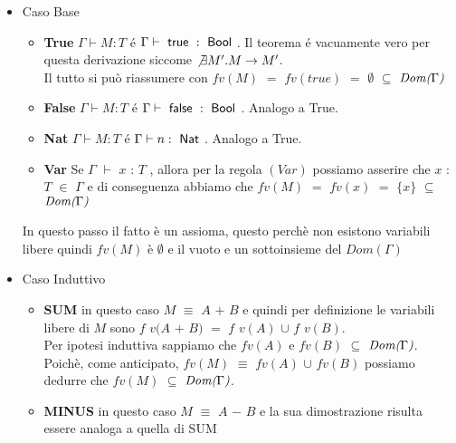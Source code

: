 \begin{itemize}


\item Caso Base 
		\begin{itemize}[label=$\star$]

		\item \textbf{True}  $\Gamma \vdash{} M : T$ \'e $\Gamma \vdash{} \true{} : \Bool$.
  		Il teorema \'e vacuamente vero per questa derivazione siccome $\not \exists{M'}. M \to{} M'$.\\
  		Il tutto si pu\`o riassumere con $fv(M)$ $=$ $fv(true)$ $=$ $\emptyset$ $\subseteq$ $\emph{Dom(}\Gamma\emph{)}$

  
 		\item \textbf{False} $\Gamma \vdash{} M : T$ \'e $\Gamma \vdash{} \false{} : \Bool$. Analogo a True.

		\item \textbf{Nat} $\Gamma \vdash{} M : T$ \'e $\Gamma \vdash{} n : \Nat$. Analogo a True.

		\item \textbf{Var}  Se $\Gamma$ $\vdash$ $x$ : $T$ , allora per la regola $(Var)$ possiamo asserire che $x$ : $T$ $\in$ $\Gamma$ e di conseguenza abbiamo che  $fv(M)$ $=$ $fv(x)$ $=$ $\{x\}$ $\subseteq$ $\emph{Dom(}\Gamma\emph{)}$

  
		\end{itemize}
		In questo passo il fatto \`e un assioma, questo perch\`e non esistono variabili libere quindi $fv(M)$ \`e $\emptyset$ e il vuoto e un sottoinsieme del $Dom(\Gamma)$

\item Caso Induttivo
		
		\begin{itemize}[label=$\star$]

		\item \textbf{SUM}  in questo caso $M$ $\equiv$ $A$ $+$ $B$ e quindi per definizione le variabili libere di $M$ sono $f$ $v(A$ $+$ $B)$ $=$ $f$ $v(A)$ $\cup$ $f$ $v(B)$.\\ Per ipotesi induttiva sappiamo che $fv(A)$ e $fv(B)$ $\subseteq$ $\emph{Dom(}\Gamma\emph{)}$.\\Poich\`e, come anticipato, $fv(M)$ $\equiv$ $fv(A)$ $\cup$ $fv(B)$ possiamo dedurre che $fv(M)$ $\subseteq$ $\emph{Dom(}\Gamma\emph{)}$.
  		
  
 		\item \textbf{MINUS} in questo caso $M$ $\equiv$ $A$ $-$ $B$ e la sua dimostrazione risulta essere analoga a quella di SUM


\end{itemize}
\end{itemize}
